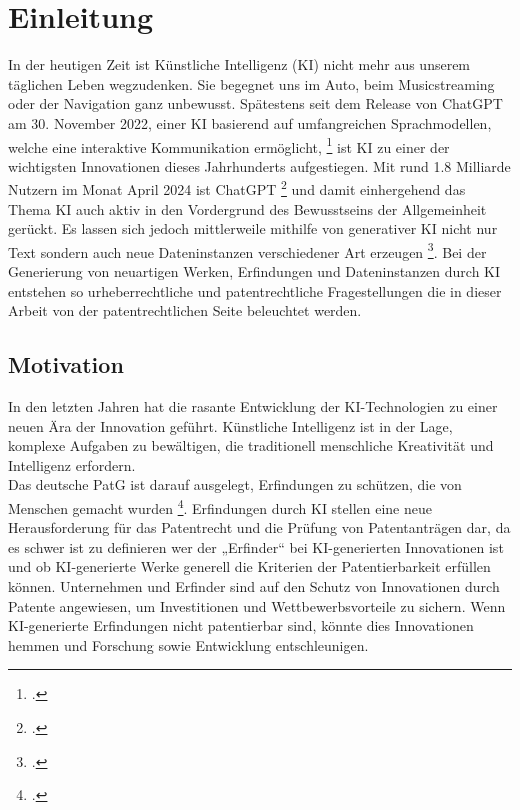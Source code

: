 \chapter{Einleitung \label{cha:chapter1}}

In der heutigen Zeit ist Künstliche Intelligenz (\gls{KI}) nicht
mehr aus unserem täglichen Leben wegzudenken. 
Sie begegnet uns im Auto, beim Musicstreaming oder der Navigation ganz unbewusst. 
Spätestens seit dem Release von ChatGPT am 30. November 2022, 
einer KI basierend auf umfangreichen Sprachmodellen, 
welche eine interaktive Kommunikation ermöglicht, 
\footcite{ChatGPT} ist KI zu einer 
der wichtigsten Innovationen dieses Jahrhunderts aufgestiegen. 
Mit rund 1.8 Milliarde Nutzern im Monat April 2024 ist ChatGPT  
\footcite{NumberChatGPTUsers2023} 
und damit einhergehend das Thema KI auch aktiv in den Vordergrund des Bewusstseins 
der Allgemeinheit gerückt. 
Es lassen sich jedoch mittlerweile mithilfe von generativer KI 
nicht nur Text sondern auch neue 
Dateninstanzen verschiedener Art erzeugen \footcite{WasIstKuenstliche}. 
Bei der Generierung von neuartigen Werken, 
Erfindungen und Dateninstanzen durch KI entstehen so 
urheberrechtliche und 
patentrechtliche Fragestellungen die in dieser Arbeit von der 
patentrechtlichen Seite beleuchtet werden.


\section{Motivation\label{sec:moti}}

In den letzten Jahren hat die rasante Entwicklung 
der KI-Technologien zu einer neuen Ära der Innovation geführt. 
Künstliche Intelligenz ist in der Lage, komplexe Aufgaben zu bewältigen, 
die traditionell menschliche Kreativität und Intelligenz erfordern. 
\\

Das deutsche \gls{PatG} ist darauf ausgelegt, 
Erfindungen zu schützen, die von Menschen gemacht wurden
\footcite{DPMAPatentschutz}. 
Erfindungen durch KI stellen eine neue Herausforderung für 
das Patentrecht und die Prüfung von Patentanträgen dar, 
da es schwer ist zu definieren wer der „Erfinder“ bei KI-generierten
Innovationen ist und ob 
KI-generierte Werke generell die Kriterien der Patentierbarkeit erfüllen können. 
Unternehmen und Erfinder sind auf den Schutz von Innovationen durch 
Patente angewiesen, um Investitionen und Wettbewerbsvorteile zu sichern. 
Wenn KI-generierte Erfindungen nicht patentierbar sind, 
könnte dies Innovationen hemmen 
und Forschung sowie Entwicklung entschleunigen. 

